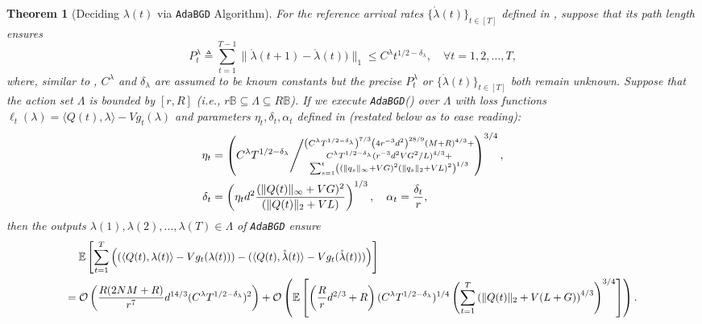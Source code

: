 \documentclass[11pt,fullpage,letterpaper]{article} %
\newtheorem{theorem}{Theorem}[section]
\renewcommand{\bm}[1]{#1}%
\renewcommand{\O}{\operatorname{\mathcal O}}
\newcommand{\E}{\operatornamewithlimits{\mathbb{E}}}
\newcommand{\BCOAlg}{\texttt{AdaBGD}\xspace}
\newcommand\scalemath[2]{\scalebox{#1}{\mbox{\ensuremath{\displaystyle #2}}}}
\begin{document}
\begin{theorem}[Deciding $\bm \lambda(t)$ via \BCOAlg Algorithm]\label{thm:multi-hop utility decision making}
For the reference arrival rates $\{\mathring{\bm \lambda}(t)\}_{t\in [T]}$ defined in , suppose that its path length ensures
\begin{equation*}
P_t^\lambda\triangleq \sum_{t=1}^{T-1} \lVert \mathring{\bm \lambda}({t+1}) - \mathring{\bm \lambda}(t)) \rVert_1\le C^\lambda t^{1/2 - \delta_\lambda},\quad \forall t=1,2,\ldots,T,
\end{equation*}
where, similar to , $C^\lambda$ and $\delta_\lambda$ are assumed to be known constants but the precise $P_t^\lambda$ or $\{\mathring{\bm \lambda}(t)\}_{t\in [T]}$ both remain unknown.
Suppose that the action set $\Lambda$ is bounded by $[r,R]$ (\textit{i.e.}, $r\mathbb B\subseteq \Lambda\subseteq R\mathbb B$).
If we execute \BCOAlg () over $\Lambda$ with loss functions $\ell_t(\bm \lambda)=\langle \bm Q(t),\bm \lambda\rangle-V g_t(\bm \lambda)$ and parameters $\eta_t,\delta_t,\alpha_t$ defined in  (restated below as  to ease reading):
\begin{align}
\eta_t&=\left (C^\lambda T^{1/2 - \delta_\lambda}\middle / \substack{\left (C^\lambda T^{1/2 - \delta_\lambda}\right )^{7/3} \left (4r^{-3} d^2 \right )^{28/9} \left (M+R\right )^{4/3}+\\
C^\lambda T^{1/2-\delta_\lambda} (r^{-3} d^2 VG^2 / L)^{4/3}+\\
\sum_{s=1}^t \left ((\lVert \bm q_s\rVert_\infty + VG)^2 (\lVert \bm q_s\rVert_2 + VL)^2\right )^{1/3}}\right )^{3/4}, \nonumber\\
\delta_t &= \left (\eta_t d^2 \frac{(\lVert \bm Q(t)\rVert_\infty + VG)^2}{(\lVert \bm Q(t)\rVert_2 + VL)}\right )^{1/3},\quad \alpha_t = \frac{\delta_t}{r},\label{eq:true learning rate in BCO restatement}
\end{align}
then the outputs $\bm \lambda(1),\bm \lambda(2),\ldots,\bm \lambda(T) \in \Lambda$ of \BCOAlg ensure
\begin{align*}
&\scalemath{0.95}{\quad \E\left [\sum_{t=1}^T \left ((\langle \bm Q(t),\bm \lambda(t)\rangle - Vg_t(\bm \lambda(t))) - (\langle \bm Q(t),\mathring{\bm \lambda}(t)\rangle - Vg_t(\mathring{\bm \lambda}(t)))\right )\right ]}\\
&\scalemath{0.95}{=\O\left (\frac{R(2NM+R)}{r^7} d^{14/3} (C^\lambda T^{1/2-\delta_\lambda})^2\right )+\O\left (\E\left [\left (\frac{R}{r} d^{2/3}+R\right ) (C^\lambda T^{1/2 - \delta_\lambda})^{1/4} \left (\sum_{t=1}^T \left (\lVert \bm Q(t)\rVert_2 + V(L+G)\right )^{4/3}\right )^{3/4}\right ]\right ).}
\end{align*}
\end{theorem}
\end{document}
